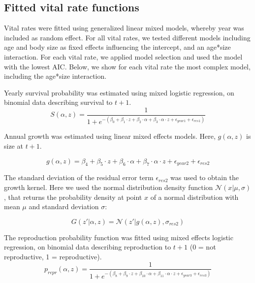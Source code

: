 \subsection{Fitted vital rate functions}
\label{app:ipm:vitalrates}
Vital rates were fitted using generalized linear mixed models, whereby year was included as random effect. For all vital rates, we tested different models including age and body size as fixed effects influencing the intercept, and an age*size interaction. For each vital rate, we applied model selection and used the model with the lowest AIC. Below, we show for each vital rate the most complex model, including the age*size interaction.

Yearly survival probability was estimated using mixed logistic regression, on binomial data describing survival to $t+1$.
\begin{equation}
S(\alpha,z) = \frac{1} {1 + e^{- (\beta_0 + \beta_{1} \cdot z + \beta_{2} \cdot \alpha + \beta_3 \cdot \alpha \cdot z + \epsilon_{year1} +  \epsilon_{res1})}}
\end{equation}

Annual growth was estimated using linear mixed effects models. Here, $g(\alpha,z)$ is size at $t+1$.

\begin{equation}
g(\alpha,z) = \beta_{4} + \beta_{5} \cdot z + \beta_{6} \cdot \alpha + \beta_7 \cdot \alpha \cdot z + \epsilon_{year2} + \epsilon_{res2}
\end{equation}

The standard deviation of the residual error term $\epsilon_{res2}$ was used to obtain the growth kernel. Here we used the normal distribution density function $\mathcal{N}(x|\mu,\sigma)$, that returns the probability density at point $x$ of a normal distribution with mean $\mu$ and standard deviation $\sigma$:

\begin{equation}
G(z'|\alpha,z) = \mathcal{N}(z'|g(\alpha,z),\sigma_{res2})
\end{equation}

The reproduction probability function was fitted using mixed effects logistic regression, on binomial data describing reproduction to $t+1$ (0 = not reproductive, 1 = reproductive).
\begin{equation}
p_{repr}(\alpha,z) = \frac{1} {1 + e^{-(\beta_8 + \beta_{9} \cdot z + \beta_{10} \cdot \alpha + \beta_{11} \cdot \alpha \cdot z + \epsilon_{year3} + \epsilon_{res3})}}
\end{equation}


